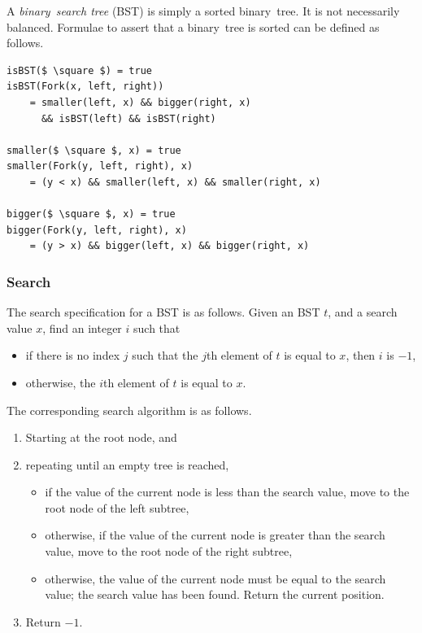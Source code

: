 A \emph{binary~search tree} (BST) is simply a sorted binary~tree.
It is not necessarily balanced.
Formulae to assert that a binary~tree is sorted can be defined as follows.
\begin{lstlisting}[mathescape=true]
isBST($ \square $) = true
isBST(Fork(x, left, right))
    = smaller(left, x) && bigger(right, x)
      && isBST(left) && isBST(right)

smaller($ \square $, x) = true
smaller(Fork(y, left, right), x)
    = (y < x) && smaller(left, x) && smaller(right, x)

bigger($ \square $, x) = true
bigger(Fork(y, left, right), x)
    = (y > x) && bigger(left, x) && bigger(right, x)
\end{lstlisting}

\subsubsection{Search}

The search specification for a BST is as follows.
Given an BST \( t \), and a search value \( x \), find an integer \( i \) such that
\begin{itemize}
  \item if there is no index \( j \) such that the \( j \)th element of \( t \) is equal to \( x \), then \( i \) is \( -1 \),
  \item otherwise, the \( i \)th element of \( t \) is equal to \( x \).
\end{itemize}

The corresponding search algorithm is as follows.
\begin{enumerate}
  \item Starting at the root node, and
  \item repeating until an empty tree is reached,
  \begin{itemize}
    \item if the value of the current node is less than the search value, move to the root node of the left subtree,
    \item otherwise, if the value of the current node is greater than the search value, move to the root node of the right subtree,
    \item otherwise, the value of the current node must be equal to the search value; the search value has been found.
    Return the current position.
  \end{itemize}
  \item Return \( -1 \).
\end{enumerate}

